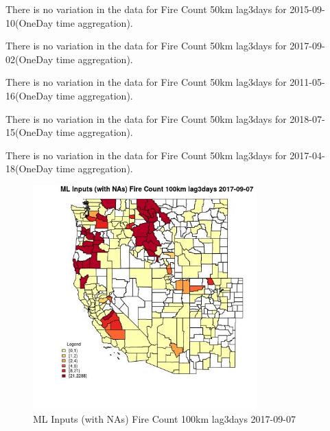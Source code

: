 There is no variation in the data for Fire Count 50km lag3days for 2015-09-10(OneDay time aggregation). 
 

There is no variation in the data for Fire Count 50km lag3days for 2017-09-02(OneDay time aggregation). 
 

There is no variation in the data for Fire Count 50km lag3days for 2011-05-16(OneDay time aggregation). 
 

There is no variation in the data for Fire Count 50km lag3days for 2018-07-15(OneDay time aggregation). 
 

There is no variation in the data for Fire Count 50km lag3days for 2017-04-18(OneDay time aggregation). 
 

\begin{figure} 
\centering  
\includegraphics[width=0.77\textwidth]{Code_Outputs/Report_ML_input_PM25_Step4_part_e_de_duplicated_aves_compiled_2019-05-21wNAs_CountyFire_Count_100km_lag3daysMean2017-09-07.jpg} 
\caption{\label{fig:Report_ML_input_PM25_Step4_part_e_de_duplicated_aves_compiled_2019-05-21wNAsCountyFire_Count_100km_lag3daysMean2017-09-07}ML Inputs (with NAs) Fire Count 100km lag3days 2017-09-07} 
\end{figure} 
 

